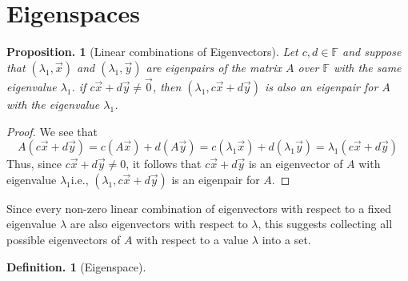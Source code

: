 \documentclass[11pt, a4paper]{memoir}
\theoremstyle{change}
\newtheorem{proposition}[theorem]{Proposition.}
\theoremstyle{plain}
\theoremstyle{nonumberplain}
\newtheorem{definition}{Definition.}
\newtheorem{proof}{Proof}
\numberwithin{equation}{section}
\begin{document}
\section{Eigenspaces}
\begin{proposition}[Linear combinations of Eigenvectors]
  Let $c, d \in \mathbb{F}$ and suppose that $(\lambda_1, \vec{x})$ and $(\lambda_1, \vec{y})$ are eigenpairs of the matrix $A$ over $\mathbb{F}$ with the same eigenvalue $\lambda_1$. if $c\vec{x} + d\vec{y} \ne \vec{0}$, then $(\lambda_1, c\vec{x} + d\vec{y})$ is also an eigenpair for $A$ with the eigenvalue $\lambda_1$.
\end{proposition}
\begin{proof}
  We see that $$A(c\vec{x} + d\vec{y}) = c(A\vec{x}) + d(A \vec{y}) = c(\lambda_1\vec{x}) + d(\lambda_1\vec{y}) = \lambda_1(c\vec{x} + d\vec{y})$$ Thus, since $c\vec{x} + d\vec{y} \ne 0$, it follows that $c\vec{x} + d\vec{y}$ is an eigenvector of $A$ with eigenvalue $\lambda_1$i.e., $(\lambda_1, c\vec{x} + d\vec{y})$ is an eigenpair for $A$.
\end{proof}
Since every non-zero linear combination of eigenvectors with respect to a fixed eigenvalue $\lambda$ are also eigenvectors with respect to $\lambda$, this suggests collecting all possible eigenvectors of $A $ with respect to a value $\lambda $ into a set.
\begin{definition}[Eigenspace]
  
\end{definition}
\end{document}
